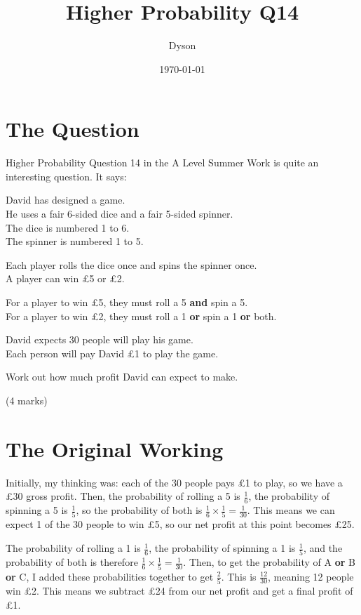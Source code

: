 \documentclass[a4paper]{article}
\title{Higher Probability Q14}
\author{Dyson}
\date{\today}
\newcommand{\oo}[1]{\frac{1}{#1}}
\begin{document}
\maketitle

\setlength{\parindent}{0em}
\setlength{\parskip}{1em}

\section{The Question}

Higher Probability Question 14 in the A Level Summer Work is quite an interesting question. It says:

David has designed a game.\\
He uses a fair 6-sided dice and a fair 5-sided spinner.\\
The dice is numbered 1 to 6.\\
The spinner is numbered 1 to 5.

Each player rolls the dice once and spins the spinner once.\\
A player can win £5 or £2.

For a player to win £5, they must roll a 5 \textbf{and} spin a 5.\\
For a player to win £2, they must roll a 1 \textbf{or} spin a 1 \textbf{or} both.

David expects 30 people will play his game.\\
Each person will pay David £1 to play the game.

Work out how much profit David can expect to make.

\hspace*{\fill}(4 marks)

\section{The Original Working}

Initially, my thinking was: each of the 30 people pays £1 to play, so we have a £30 gross profit. Then, the probability of rolling a 5 is $\oo{6}$, the probability of spinning a 5 is $\oo{5}$, so the probability of both is $\oo{6} \times \oo{5} = \oo{30}$. This means we can expect 1 of the 30 people to win £5, so our net profit at this point becomes £25.

The probability of rolling a 1 is $\oo{6}$, the probability of spinning a 1 is $\oo{5}$, and the probability of both is therefore $\oo{6} \times \oo{5} = \oo{30}$. Then, to get the probability of A \textbf{or} B \textbf{or} C, I added these probabilities together to get $\frac{2}{5}$. This is $\frac{12}{30}$, meaning 12 people win £2. This means we subtract £24 from our net profit and get a final profit of £1.
\end{document}
